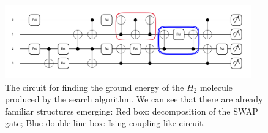 \documentclass[a4paper,onecolumn,11pt]{quantumarticle}
\begin{document}
\begin{figure}[H]
  \centering
  \includegraphics[width=0.95\textwidth]{Figures/fig_h2_vac_init_circ.pdf}
  \caption{The circuit for finding the ground energy of the $H_2$ molecule produced by the search algorithm. We can see that there are already familiar structures emerging: Red box: decomposition of the SWAP gate; Blue double-line box: Ising coupling-like circuit.}
  \label{fig:h2_circ}
\end{figure}
\end{document}
